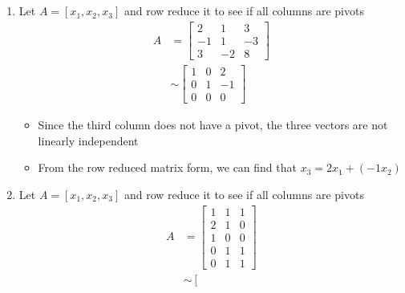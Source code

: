 \documentclass[12pt]{article}
\begin{document}
        \subsection{}
            \begin{enumerate}[label=(\alph*)]
                \item Let $A = [x_1, x_2, x_3]$ and row reduce it to see if all columns are pivots
                    \begin{align*}
                        A &= \left[\begin{matrix}
                            2 & 1 & 3\\
                            -1 & 1 & -3\\
                            3 & -2 & 8
                        \end{matrix}\right]\\
                        &\sim \left[\begin{matrix}
                            1 & 0 & 2\\
                            0 & 1 & -1\\
                            0 & 0 & 0
                        \end{matrix}\right]
                    \end{align*}
                    \begin{itemize}
                        \item Since the third column does not have a pivot, the three vectors are not linearly independent 
                        \item From the row reduced matrix form, we can find that $x_3 = 2x_1 + (-1x_2)$
                    \end{itemize}
                \item Let $A = [x_1, x_2, x_3]$ and row reduce it to see if all columns are pivots
                    \begin{align*}
                        A &= \left[\begin{matrix}
                            1 & 1 & 1\\
                            2 & 1 & 0\\
                            1 & 0 & 0\\
                            0 & 1 & 1\\
                            0 & 1 & 1
                        \end{matrix}\right]\\
                        &\sim \left[\begin{matrix}

\end{matrix}
\end{align*}
\end{enumerate}
\end{document}
